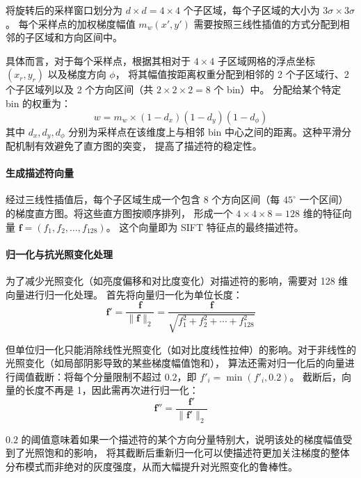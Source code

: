 \documentclass[12pt,hyperref,a4paper,UTF8]{ctexart}
\begin{document}
将旋转后的采样窗口划分为 $d \times d = 4 \times 4$ 个子区域，每个子区域的大小为 $3\sigma \times 3\sigma$。
每个采样点的加权梯度幅值 $m_w(x',y')$ 需要按照三线性插值的方式分配到相邻的子区域和方向区间中。

具体而言，对于每个采样点，根据其相对于 $4 \times 4$ 子区域网格的浮点坐标 $(x_r, y_r)$ 以及梯度方向 $\phi$，
将其幅值按距离权重分配到相邻的 2 个子区域行、2 个子区域列以及 2 个方向区间（共 $2 \times 2 \times 2 = 8$ 个 bin）中。
分配给某个特定 bin 的权重为：
\begin{equation}
    w = m_w \times (1 - d_x)(1 - d_y)(1 - d_\phi)
\end{equation}
其中 $d_x, d_y, d_\phi$ 分别为采样点在该维度上与相邻 bin 中心之间的距离。这种平滑分配机制有效避免了直方图的突变，
提高了描述符的稳定性。

\paragraph{生成描述符向量}

经过三线性插值后，每个子区域生成一个包含 8 个方向区间（每 $45^\circ$ 一个区间）的梯度直方图。将这些直方图按顺序排列，
形成一个 $4 \times 4 \times 8 = 128$ 维的特征向量 $\mathbf{f} = (f_1, f_2, \dots, f_{128})$。
这个向量即为 SIFT 特征点的最终描述符。

\paragraph{归一化与抗光照变化处理}
为了减少光照变化（如亮度偏移和对比度变化）对描述符的影响，需要对 128 维向量进行归一化处理。
首先将向量归一化为单位长度：
\begin{equation}
    \mathbf{f}' = \frac{\mathbf{f}}{\|\mathbf{f}\|_2} = \frac{\mathbf{f}}{\sqrt{f_1^2 + f_2^2 + \cdots + f_{128}^2}}
\end{equation}

但单位归一化只能消除线性光照变化（如对比度线性拉伸）的影响。对于非线性的光照变化（如局部阴影导致的某些梯度幅值饱和），
算法还需对归一化后的向量进行阈值截断：将每个分量限制不超过 $0.2$，即 $f'_i = \min(f'_i, 0.2)$。
截断后，向量的长度不再是 1，因此需再次进行归一化：
\begin{equation}
    \mathbf{f}'' = \frac{\mathbf{f}'}{\|\mathbf{f}'\|_2}
\end{equation}

$0.2$ 的阈值意味着如果一个描述符的某个方向分量特别大，说明该处的梯度幅值受到了光照饱和的影响，
将其截断后重新归一化可以使描述符更加关注梯度的整体分布模式而非绝对的灰度强度，从而大幅提升对光照变化的鲁棒性。
\end{document}
